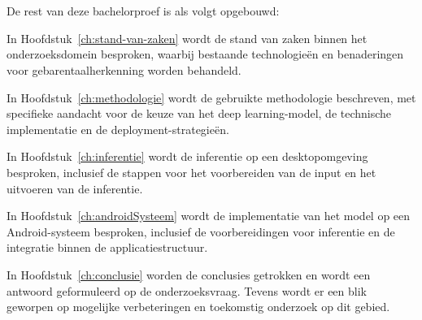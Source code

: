 \section{}
\label{sec:opzet-bachelorproef}

De rest van deze bachelorproef is als volgt opgebouwd:

In Hoofdstuk~\ref{ch:stand-van-zaken} wordt de stand van zaken binnen het onderzoeksdomein besproken, waarbij bestaande technologieën en benaderingen voor gebarentaalherkenning worden behandeld.

In Hoofdstuk~\ref{ch:methodologie} wordt de gebruikte methodologie beschreven, met specifieke aandacht voor de keuze van het deep learning-model, de technische implementatie en de deployment-strategieën.

In Hoofdstuk~\ref{ch:inferentie} wordt de inferentie op een desktopomgeving besproken, inclusief de stappen voor het voorbereiden van de input en het uitvoeren van de inferentie.

In Hoofdstuk~\ref{ch:androidSysteem} wordt de implementatie van het model op een Android-systeem besproken, inclusief de voorbereidingen voor inferentie en de integratie binnen de applicatiestructuur.

In Hoofdstuk~\ref{ch:conclusie} worden de conclusies getrokken en wordt een antwoord geformuleerd op de onderzoeksvraag. Tevens wordt er een blik geworpen op mogelijke verbeteringen en toekomstig onderzoek op dit gebied.
